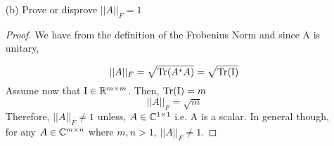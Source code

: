 \documentclass{article}
\begin{document}
\begin{enumerate}
\begin{enumerate}
    \item[(b)] Prove or disprove $||A||_F = 1$

    \begin{proof}

        We have from the definition of the Frobenius Norm and since A is unitary, 

        \[
            ||A||_F = \sqrt{\text{Tr}(A^*A)} = \sqrt{\text{Tr}(\mathrm{I})}
        \]
        Assume now that $\mathrm{I} \in \mathbb{R}^{m\times m}$. Then, $\text{Tr}(\mathrm{I}) = m$
        \[
            ||A||_F = \sqrt{m}
        \]
        Therefore, $||A||_F \neq 1$ unless, $A \in \mathbb{C}^{1\times 1}$ i.e. A is a scalar. In general though, for any $A \in \mathbb{C}^{m\times n}$ where $m, n > 1$, $||A||_F \neq 1$. 
    \end{proof}

    \end{enumerate}
    
    


\end{enumerate}
\end{document}
